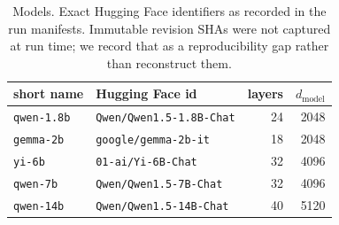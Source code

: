 
\begin{table}[h]
\centering
\caption{Models. Exact Hugging Face identifiers as recorded in the run manifests. Immutable revision SHAs were not captured at run time; we record that as a reproducibility gap rather than reconstruct them.}
\label{tab:models}
\begin{tabular}{llrr}
\toprule
short name & Hugging Face id & layers & $d_{\mathrm{model}}$ \\
\midrule
\texttt{qwen-1.8b} & \texttt{Qwen/Qwen1.5-1.8B-Chat} & 24 & 2048 \\
\texttt{gemma-2b} & \texttt{google/gemma-2b-it} & 18 & 2048 \\
\texttt{yi-6b} & \texttt{01-ai/Yi-6B-Chat} & 32 & 4096 \\
\texttt{qwen-7b} & \texttt{Qwen/Qwen1.5-7B-Chat} & 32 & 4096 \\
\texttt{qwen-14b} & \texttt{Qwen/Qwen1.5-14B-Chat} & 40 & 5120 \\
\bottomrule
\end{tabular}
\end{table}

